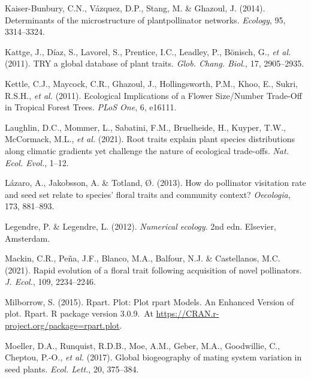 \documentclass[
  12pt,
  a4paper,
]{article}
\newlength{\cslhangindent}
\newlength{\cslentryspacingunit} %
\newenvironment{CSLReferences}[2] %
 {%
  \setlength{\parindent}{0pt}
  \ifodd #1
  \let\oldpar\par
  \def\par{\hangindent=\cslhangindent\oldpar}
  \fi
  \setlength{\parskip}{#2\cslentryspacingunit}
 }%
 {}
\begin{document}
\begin{CSLReferences}{1}{0}
\leavevmode{}%
Kaiser-Bunbury, C.N., Vázquez, D.P., Stang, M. \& Ghazoul, J. (2014). Determinants of the microstructure of plant\textendash pollinator networks. \emph{Ecology}, 95, 3314--3324.

\leavevmode{}%
Kattge, J., Díaz, S., Lavorel, S., Prentice, I.C., Leadley, P., Bönisch, G., \emph{et al.} (2011). {TRY} \textendash{} a global database of plant traits. \emph{Glob. Chang. Biol.}, 17, 2905--2935.

\leavevmode{}%
Kettle, C.J., Maycock, C.R., Ghazoul, J., Hollingsworth, P.M., Khoo, E., Sukri, R.S.H., \emph{et al.} (2011). Ecological {Implications} of a {Flower Size}/{Number Trade}-{Off} in {Tropical Forest Trees}. \emph{PLoS One}, 6, e16111.

\leavevmode{}%
Laughlin, D.C., Mommer, L., Sabatini, F.M., Bruelheide, H., Kuyper, T.W., McCormack, M.L., \emph{et al.} (2021). Root traits explain plant species distributions along climatic gradients yet challenge the nature of ecological trade-offs. \emph{Nat. Ecol. Evol.}, 1--12.

\leavevmode{}%
Lázaro, A., Jakobsson, A. \& Totland, Ø. (2013). How do pollinator visitation rate and seed set relate to species' floral traits and community context? \emph{Oecologia}, 173, 881--893.

\leavevmode{}%
Legendre, P. \& Legendre, L. (2012). \emph{Numerical ecology}. {2nd edn}. {Elsevier, Amsterdam}.

\leavevmode{}%
Mackin, C.R., Peña, J.F., Blanco, M.A., Balfour, N.J. \& Castellanos, M.C. (2021). Rapid evolution of a floral trait following acquisition of novel pollinators. \emph{J. Ecol.}, 109, 2234--2246.

\leavevmode{}%
Milborrow, S. (2015). Rpart. Plot: {Plot} rpart {Models}. {An Enhanced Version} of plot. Rpart. R package version 3.0.9.~At \href{https://CRAN.R-project.org/package=rpart.plot}{https://CRAN.r-project.org/package=rpart.plot}.

\leavevmode{}%
Moeller, D.A., Runquist, R.D.B., Moe, A.M., Geber, M.A., Goodwillie, C., Cheptou, P.-O., \emph{et al.} (2017). Global biogeography of mating system variation in seed plants. \emph{Ecol. Lett.}, 20, 375--384.


\end{CSLReferences}
\end{document}
